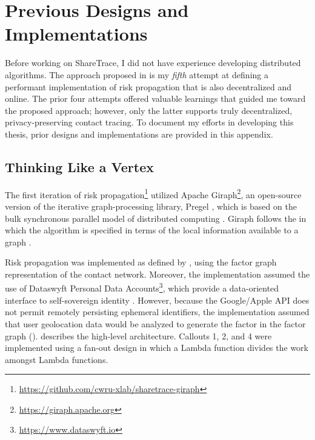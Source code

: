 \chapter{Previous Designs and Implementations}\label{sec:previous-designs}


Before working on ShareTrace, I did not have experience developing distributed algorithms. The approach proposed in  is my \emph{fifth} attempt at defining a performant implementation of risk propagation that is also decentralized and online. The prior four attempts offered valuable learnings that guided me toward the proposed approach; however, only the latter supports truly decentralized, privacy-preserving contact tracing. To document my efforts in developing this thesis, prior designs and implementations are provided in this appendix.

\section{Thinking Like a Vertex}\label{sec:giraph}

The first iteration of risk propagation\footnote{\url{https://github.com/cwru-xlab/sharetrace-giraph}} utilized Apache Giraph\footnote{\url{https://giraph.apache.org}}, an open-source version of the iterative graph-processing library, Pregel \citep{Malewicz2010}, which is based on the bulk synchronous parallel model of distributed computing \citep{Valiant1990}. Giraph follows the  in which the algorithm is specified in terms of the local information available to a graph \vertexName{} \citep{McCune2015}.

Risk propagation was implemented as defined by \citet{Ayday2020,Ayday2021}, using the factor graph representation of the contact network. Moreover, the implementation assumed the use of Dataswyft Personal Data Accounts\footnote{\url{https://www.dataswyft.io}}, which provide a data-oriented interface to self-sovereign identity \citep[pp. 98--99]{Preukschat2021}. However, because the Google/Apple API does not permit remotely persisting ephemeral identifiers, the implementation assumed that user geolocation data would be analyzed to generate the factor \verticesName{} in the factor graph ().  describes the high-level architecture. Callouts 1, 2, and 4 were implemented using a fan-out design in which a  Lambda function divides the work amongst  Lambda functions.

